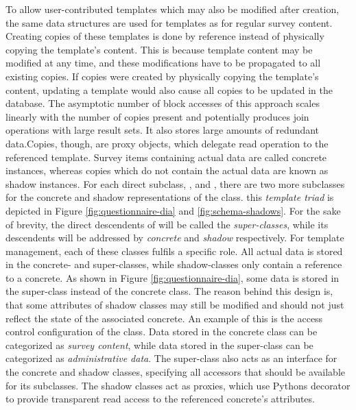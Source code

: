         To allow user-contributed templates which may also be modified after
        creation, the same data structures are used for templates as for
        regular survey content. Creating copies of these templates is done by
        reference instead of physically copying the template's content.
        This is because template content may be modified
        at any time, and these modifications have to be propagated to
        all existing copies. If copies were created by physically
        copying the template's content, updating a template would
        also cause all copies to be updated in the database. The
        asymptotic number of block accesses of this approach scales linearly
        with the number of copies present and potentially produces
        join operations with large result sets. It also stores
        large amounts of redundant data.Copies, though, are
        proxy objects, which delegate read operation to the referenced
        template. Survey items containing actual data are called
        concrete instances, whereas copies which do not contain
        the actual data are known as shadow instances.
        For each direct  subclass, , 
        and , there are two more subclasses for the concrete and shadow
        representations of the class. this \textit{template triad} is depicted in 
        Figure \ref{fig:questionnaire-dia} and \ref{fig:schema-shadows}. For the sake of brevity,
        the direct descendents of  will be called the \textit{super-classes},
        while its descendents will be addressed by \textit{concrete} and \textit{shadow}
        respectively. For template management,
        each of these classes fulfils a specific role. All actual data is stored
        in the concrete- and super-classes, while shadow-classes only
        contain a reference to a concrete. As shown in Figure \ref{fig:questionnaire-dia},
        some data is stored in the super-class instead of the concrete class.
        The reason behind this design is, that some attributes of shadow classes
        may still be modified and should not just reflect the state of the associated
        concrete. An example of this is the access control configuration
        of the  class. Data stored in the concrete
        class can be categorized as \textit{survey content}, while data
        stored in the super-class can be categorized as \textit{administrative data}.
        The super-class also acts as an interface for the concrete and shadow classes,
        specifying all accessors that should be available for its subclasses.
        The shadow classes act as proxies, which use Pythons 
        decorator to provide transparent read access to the referenced concrete's
        attributes.

